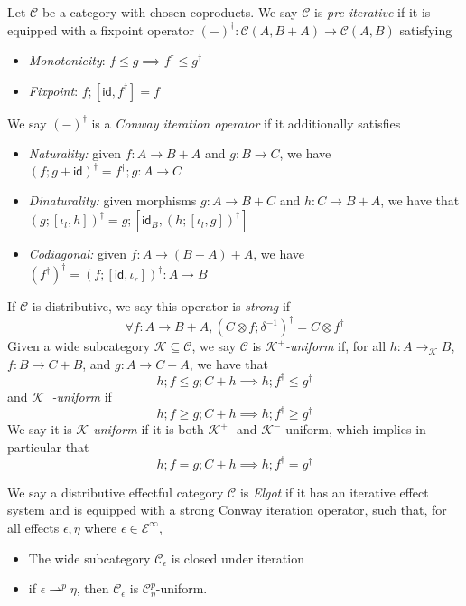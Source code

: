 \documentclass[acmsmall,screen,review]{acmart}
\newcommand{\mc}[1]{\ensuremath{\mathcal{#1}}}
\newcommand{\ms}[1]{\ensuremath{\mathsf{#1}}}
\newcommand{\rightmove}{\rightharpoonup}
\begin{document}
\begin{definition}
  Let $\mc{C}$ be a category with chosen coproducts. We say $\mc{C}$ is \emph{pre-iterative} if it
  is equipped with a fixpoint operator $(-)^\dagger : \mc{C}(A, B + A) \to \mc{C}(A, B)$ satisfying
  \begin{itemize}
    \item \emph{Monotonicity}: $f \leq g \implies f^\dagger \leq g^\dagger$
    \item \emph{Fixpoint}: $f ; [\ms{id}, f^\dagger] = f$
  \end{itemize}
  We say $(-)^\dagger$ is a \emph{Conway iteration operator} if it additionally satisfies
  \begin{itemize}
    \item \emph{Naturality:} given $f : A \to B + A$ and $g : B \to C$, we have
      $
      (f;g + \ms{id})^\dagger = f^\dagger;g : A \to C
      $
    \item \emph{Dinaturality:} given morphisms $g : A \to B + C$ and $h : C \to B + A$, we have that
      $
      (g ; [\iota_l, h])^\dagger = g ; [\ms{id}_B, (h ; [\iota_l, g])^\dagger]
      $
    \item \emph{Codiagonal:} given $f : A \to (B + A) + A$, we have
      $
      (f^\dagger)^\dagger = (f;[\ms{id}, \iota_r])^\dagger : A \to B
      $
  \end{itemize}
  If $\mc{C}$ is distributive, we say this operator is \emph{strong} if
  $$
  \forall f: A \to B + A, (C \otimes f ; \delta^{-1})^\dagger = C \otimes f^\dagger
  $$
  Given a wide subcategory $\mc{K} \subseteq \mc{C}$, we say $\mc{C}$ is \emph{$\mc{K}^+$-uniform}
  if, for all $h : A \to_{\mc{K}} B$, $f : B \to C + B$, and $g : A \to C + A$, we have that
  $$
  h ; f \leq g ; C + h \implies h ; f^\dagger \leq g^\dagger 
  $$
  and \emph{$\mc{K}^-$-uniform} if
  $$
  h ; f \geq g ; C + h \implies h ; f^\dagger \geq g^\dagger 
  $$
  We say it is \emph{$\mc{K}$-uniform} if it is both $\mc{K}^+$- and $\mc{K}^-$-uniform, which
  implies in particular that
  $$
  h ; f = g ; C + h \implies h ; f^\dagger = g^\dagger 
  $$
\end{definition}

\begin{definition}
  We say a distributive effectful category $\mc{C}$ is \emph{Elgot} if it has an iterative effect
  system and is equipped with a strong Conway iteration operator, such that, for all effects
  $\epsilon, \eta$ where $\epsilon \in \mc{E}^\infty$,
  \begin{itemize}
    \item The wide subcategory $\mc{C}_\epsilon$ is closed under iteration
    \item if $\epsilon \rightmove^p \eta$, then $\mc{C}_\epsilon$ is $\mc{C}_\eta^p$-uniform.
  \end{itemize}
\end{definition}
\end{document}
